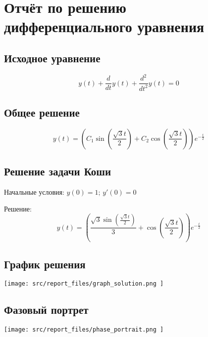 \documentclass{article}
\begin{document}
\section{Отчёт по решению дифференциального уравнения}

\subsection{Исходное уравнение}
\[ y{\left(t \right)} + \frac{d}{d t} y{\left(t \right)} + \frac{d^{2}}{d t^{2}} y{\left(t \right)} = 0 \]


\subsection{Общее решение}
\[ y{\left(t \right)} = \left(C_{1} \sin{\left(\frac{\sqrt{3} t}{2} \right)} + C_{2} \cos{\left(\frac{\sqrt{3} t}{2} \right)}\right) e^{- \frac{t}{2}} \]

\subsection{Решение задачи Коши}


Начальные условия: $y(0) = 1$; $y'(0) = 0$


\noindent Решение:
\[ y{\left(t \right)} = \left(\frac{\sqrt{3} \sin{\left(\frac{\sqrt{3} t}{2} \right)}}{3} + \cos{\left(\frac{\sqrt{3} t}{2} \right)}\right) e^{- \frac{t}{2}} \]





\subsection{График решения}
\begin{center}
\texttt{[image:  src/report\_files/graph\_solution.png ]}
\end{center}



\subsection{Фазовый портрет}
\begin{center}
\texttt{[image:  src/report\_files/phase\_portrait.png ]}
\end{center}
\end{document}
